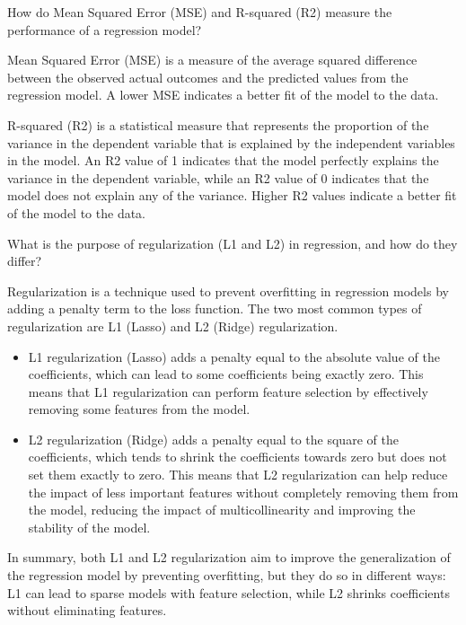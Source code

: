 \begin{ejercicio}
    How do Mean Squared Error (MSE) and R-squared (R2) measure the performance of a regression model?

    Mean Squared Error (MSE) is a measure of the average squared difference between the observed actual outcomes and the predicted values from the regression model. A lower MSE indicates a better fit of the model to the data.

    R-squared (R2) is a statistical measure that represents the proportion of the variance in the dependent variable that is explained by the independent variables in the model. An R2 value of 1 indicates that the model perfectly explains the variance in the dependent variable, while an R2 value of 0 indicates that the model does not explain any of the variance. Higher R2 values indicate a better fit of the model to the data.
\end{ejercicio}

\begin{ejercicio}
    What is the purpose of regularization (L1 and L2) in regression, and how do they differ?

    Regularization is a technique used to prevent overfitting in regression models by adding a penalty term to the loss function. The two most common types of regularization are L1 (Lasso) and L2 (Ridge) regularization.
    \begin{itemize}
        \item L1 regularization (Lasso) adds a penalty equal to the absolute value of the coefficients, which can lead to some coefficients being exactly zero. This means that L1 regularization can perform feature selection by effectively removing some features from the model.
        \item  L2 regularization (Ridge) adds a penalty equal to the square of the coefficients, which tends to shrink the coefficients towards zero but does not set them exactly to zero. This means that L2 regularization can help reduce the impact of less important features without completely removing them from the model, reducing the impact of multicollinearity and improving the stability of the model.
    \end{itemize}

    In summary, both L1 and L2 regularization aim to improve the generalization of the regression model by preventing overfitting, but they do so in different ways: L1 can lead to sparse models with feature selection, while L2 shrinks coefficients without eliminating features.
\end{ejercicio}